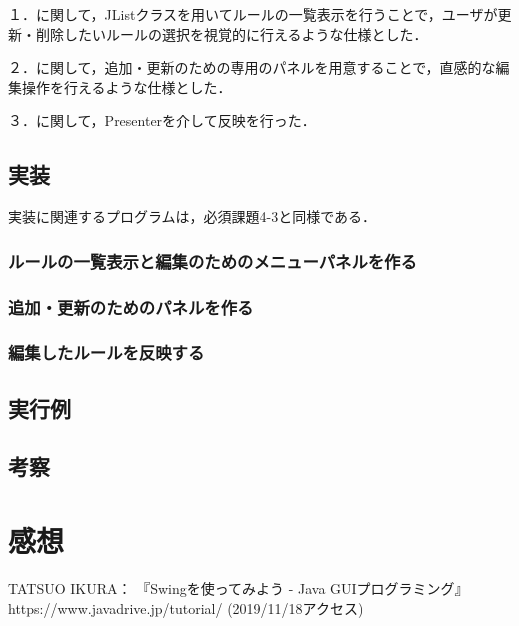 \documentclass[12pt]{jarticle}
\begin{document}
１．に関して，JListクラスを用いてルールの一覧表示を行うことで，ユーザが更新・削除したいルールの選択を視覚的に行えるような仕様とした．

２．に関して，追加・更新のための専用のパネルを用意することで，直感的な編集操作を行えるような仕様とした．

３．に関して，Presenterを介して反映を行った．

\subsection{実装}
実装に関連するプログラムは，必須課題4-3と同様である．

\subsubsection{ルールの一覧表示と編集のためのメニューパネルを作る}

\subsubsection{追加・更新のためのパネルを作る}

\subsubsection{編集したルールを反映する}

\clearpage

\subsection{実行例}

\clearpage

\subsection{考察}

\section{感想}


\begin{thebibliography}{99}
TATSUO IKURA： 『Swingを使ってみよう - Java GUIプログラミング』 https://www.javadrive.jp/tutorial/ (2019/11/18アクセス) \\
\end{thebibliography}
\end{document}
